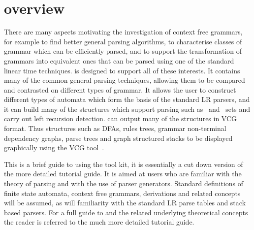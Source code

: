 \vspace*{\fill}
\begin{center}
\end{center}


\clearpage
{}
\tableofcontents
\clearpage
\setcounter{page}{0}
\section{\gtb overview}

There are many aspects motivating the investigation of context free
grammars, for example
to find better general parsing algorithms, to characterise classes of grammar
which can be efficiently parsed, and to support the transformation of
grammars into equivalent ones that can be parsed using one of the
standard linear time techniques.  \gtb is designed to support all
of these interests. 
It contains many of the common general
parsing techniques, allowing them to be compared and contrasted on
different types of grammar. It allows the user to construct
different types of automata which form the basis of the standard LR
parsers, and it can build many of the structures which support parsing
such as \first\ and \follow\ sets and carry out
left recursion detection.
\gtb can output many of the structures in VCG format. Thus 
structures such as DFAs, rules trees, grammar non-terminal dependency
graphs, parse trees and graph structured stacks to be displayed 
graphically using the VCG tool~\cite{SANDER95}.

This is a brief guide to using the \gtb tool kit, it is essentially a
cut down version of the more detailed \gtb tutorial guide. 
It is aimed at users
who are familiar with the theory of parsing and with the use of parser
generators. Standard definitions of finite state automata,
context free grammars, derivations
and related concepts will be assumed, as will familiarity with the
standard LR parse tables and stack based parsers. For a full guide to
\gtb and the related underlying theoretical concepts the reader is
referred to the much more detailed \gtb tutorial guide.


